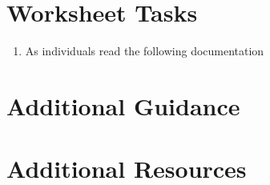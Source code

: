 \documentclass{../../../fal_assignment}
\begin{document}
\section*{Worksheet Tasks}

\begin{enumerate}
	\item As individuals read the following documentation
\end{enumerate}

\section*{Additional Guidance}



\section*{Additional Resources}

\end{document}
